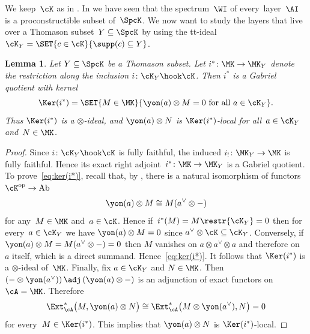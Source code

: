 \documentclass[11pt]{amsart}
\numberwithin{equation}{section} %
\theoremstyle{plain}
\newtheorem{lem}[equation]{Lemma}
\theoremstyle{definition}
\theoremstyle{remark}
\begin{document}
We keep~$\cK$ as in .
In  we have seen that the spectrum~$\WI$ of every~layer~$\AI$ is a proconstructible subset of~$\SpcK$. We now want to study the layers that live over a Thomason subset~$Y\subseteq \SpcK$ by using the tt-ideal~$\cK_Y=\SET{c\in\cK}{\supp(c)\subseteq Y}$.

%
\begin{lem}
\label{lem:ker(i*)}%
Let $Y \subseteq \SpcK$ be a Thomason subset.
Let $i^{\ast}\colon \MK \to \MK_{Y}$ denote the restriction along the inclusion $i \colon \cK_{Y} \hook \cK$. Then $i^{\ast}$ is a Gabriel quotient with kernel
\begin{equation}
\label{eq:ker(i*)}%
    \Ker(i^{\ast}) = \SET{ M \in \MK}{\yon(a) \otimes M = 0 \textrm{ for all }a\in \cK_Y}.
\end{equation}
Thus $\Ker(i^{\ast})$ is a $\otimes$-ideal, and $\yon(a) \otimes N$ is $\Ker(i^{\ast})$-local for all~$a \in \cK_Y$ and~$N \in \MK$.  
\end{lem}
\begin{proof}
Since $i \colon \cK_{Y} \hook \cK$ is fully faithful, the induced $i_{!}\colon \MK_Y\to \MK$ is fully faithful. Hence its exact right adjoint~$i^{\ast}\colon \MK\to \MK_Y$ is a Gabriel quotient.
To prove~\eqref{eq:ker(i*)}, recall that, by \cite[Lemma 2.5]{BalmerKrauseStevenson19}, there is a natural isomorphism of functors $\cK^{\rm{op}} \to \rm{Ab}$
\begin{equation}\label{eq:tensor-with-representables}
    \yon(a) \otimes M \cong M(a^{\vee} \otimes -)
\end{equation}
for any~$M \in \MK$ and~$a \in \cK$. 
Hence if~$i^{\ast}(M)=M\restr{\cK_Y}=0$ then for every~$a\in\cK_Y$ we have $\yon(a)\otimes M=0$ since $a^\vee\otimes\cK\subseteq\cK_Y$. Conversely, if $\yon(a)\otimes M=M(a^\vee\otimes -)=0$ then $M$ vanishes on $a\otimes a^\vee\otimes a$ and therefore on~$a$ itself, which is a direct summand.
Hence~\eqref{eq:ker(i*)}. It follows that $\Ker(i^*)$ is a $\otimes$-ideal of~$\MK$. Finally, fix $a \in \cK_Y$ and $N \in \MK$. Then $(- \otimes \yon(a^{\vee})) \,\adj\, (\yon(a) \otimes -)$ is an adjunction of exact functors on~$\cA=\MK$. Therefore
\begin{equation*}
    \Ext^*_{\cA}\big(M, \yon(a) \otimes N\big) \cong \Ext^*_{\cA}\big( M \otimes \yon(a^{\vee}), N\big) = 0
\end{equation*}
for every~$M \in \Ker(i^{\ast})$.
This implies that $\yon(a) \otimes N$ is $\Ker(i^{\ast})$-local.
\end{proof}
\end{document}
